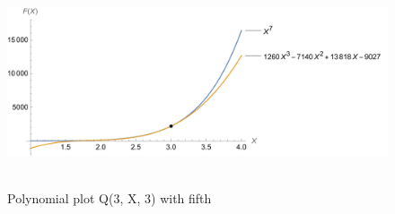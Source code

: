 ﻿\begin{figure}[H]
    \centering
    \includegraphics[width=1\textwidth]{sections/images/06_plots_polynomial_q3_n3_with_seventh}
    ~\caption{Polynomial plot Q(3, X, 3) with fifth}\label{fig:figure12}
\end{figure}
